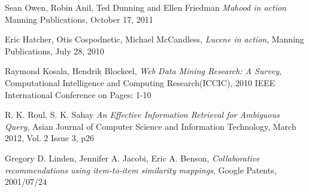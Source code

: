 \begin{thebibliography}{99}
		Sean Owen, Robin Anil, Ted Dunning and Ellen Friedman
		\emph{Mahood in action}
		Manning Publications,
		October 17, 2011


		Eric Hatcher, Otis Cospodnetic, Michael McCandless,
		\emph{Lucene in action},
		Manning Publications,
		July 28, 2010


		Raymond Kosala, Hendrik Blockeel,
		\emph{Web Data Mining Research: A Survey},
		Computational Intelligence and Computing Research(ICCIC),
		2010 IEEE International Conference on
		Pages: 1-10

		R. K. Roul, S. K. Sahay
		\emph{An Effective Information Retrieval for Ambiguous Query},
		Asian Journal of Computer Science and Information Technology,
		March 2012,
		Vol. 2 Issue 3, p26

		Gregory D. Linden, Jennifer A. Jacobi, Eric A. Benson,
		\emph{Collaborative recommendations using item-to-item similarity mappings},
		Google Patents,
		2001/07/24
		\end{thebibliography}


